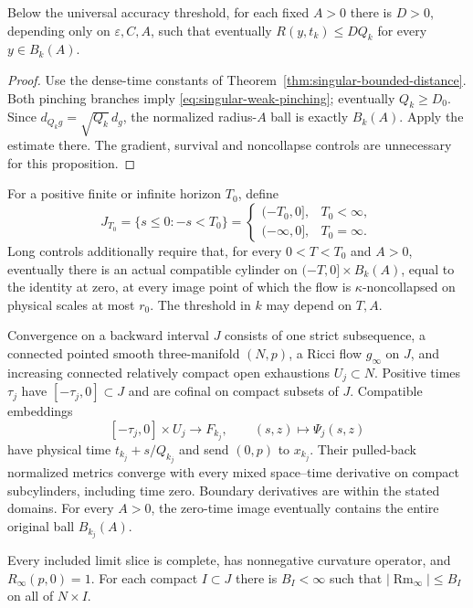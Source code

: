 \begin{proposition}
\label{prop:singular-m29}
Below the universal accuracy threshold, for each fixed $A>0$ there is
$D>0$, depending only on $\varepsilon,C,A$, such that eventually
$R(y,t_k)\leq DQ_k$ for every $y\in B_k(A)$.
\end{proposition}

\begin{proof}
Use the dense-time constants of
Theorem~\ref{thm:singular-bounded-distance}. Both pinching branches imply
\eqref{eq:singular-weak-pinching}; eventually $Q_k\geq D_0$.
Since $d_{Q_kg}=\sqrt{Q_k}\,d_g$, the normalized radius-$A$ ball is
exactly $B_k(A)$. Apply the estimate there. The gradient, survival and
noncollapse controls are unnecessary for this proposition.
\end{proof}

For a positive finite or infinite horizon $T_0$, define
\begin{equation}
 J_{T_0}=\{s\leq0:-s<T_0\}
 =\begin{cases}(-T_0,0],&T_0<\infty,\\(-\infty,0],&T_0=\infty.
 \end{cases}
 \label{eq:singular-limit-domain}
\end{equation}
Long controls additionally require that, for every $0<T<T_0$ and $A>0$,
eventually there is an actual compatible cylinder on
$(-T,0]\times B_k(A)$, equal to the identity at zero, at every image
point of which the flow is $\kappa$-noncollapsed on physical scales at
most $r_0$. The threshold in $k$ may depend on $T,A$.

\begin{definition}
\label{def:singular-convergence}
Convergence on a backward interval $J$ consists of one strict subsequence,
a connected pointed smooth three-manifold $(N,p)$, a Ricci flow $g_\infty$
on $J$, and increasing connected relatively compact open exhaustions
$U_j\subset N$. Positive times $\tau_j$ have
$[-\tau_j,0]\subset J$ and are cofinal on compact subsets of $J$.
Compatible embeddings
\[
 [-\tau_j,0]\times U_j\longrightarrow F_{k_j},\qquad
       (s,z)\longmapsto\Psi_j(s,z)
\]
have physical time $t_{k_j}+s/Q_{k_j}$ and send $(0,p)$ to $x_{k_j}$.
Their pulled-back normalized metrics converge with every mixed
space--time derivative on compact subcylinders, including time zero.
Boundary derivatives are within the stated domains. For every $A>0$,
the zero-time image eventually contains the entire original ball
$B_{k_j}(A)$.

Every included limit slice is complete, has nonnegative curvature operator,
and $R_\infty(p,0)=1$. For each compact $I\subset J$ there is $B_I<\infty$
such that $|\operatorname{Rm}_\infty|\leq B_I$ on all of $N\times I$.
\end{definition}

